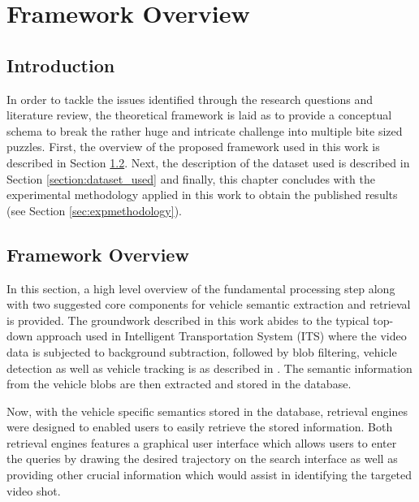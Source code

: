 \chapter{Framework Overview}
\label{chapter:framework}
\section{Introduction}
In order to tackle the issues identified through the research questions and literature review, the theoretical framework is laid as to provide a conceptual schema to break the rather huge and intricate challenge into multiple bite sized puzzles. First, the overview of the proposed framework used in this work is described in Section \ref{section:framework}. Next, the description of the dataset used is described in Section \ref{section:dataset_used} and finally, this chapter concludes with the experimental methodology applied in this work to obtain the published results (see Section \ref{sec:expmethodology}). 



\section{Framework Overview}
\label{section:framework}
In this section, a high level overview of the fundamental processing step along with two suggested core components for vehicle semantic extraction and retrieval is provided. The groundwork described in this work abides to the typical top-down approach used in Intelligent Transportation System (ITS) where the video data is subjected to background subtraction, followed by blob filtering, vehicle detection as well as vehicle tracking is as described in \cite{lim2017}. The semantic information from the vehicle blobs are then extracted and stored in the database. 

Now, with the vehicle specific semantics stored in the database, retrieval engines were designed to enabled users to easily retrieve the stored information. Both retrieval engines features a graphical user interface which allows users to enter the queries by drawing the desired trajectory on the search interface as well as providing other crucial information which would assist in identifying the targeted video shot.


